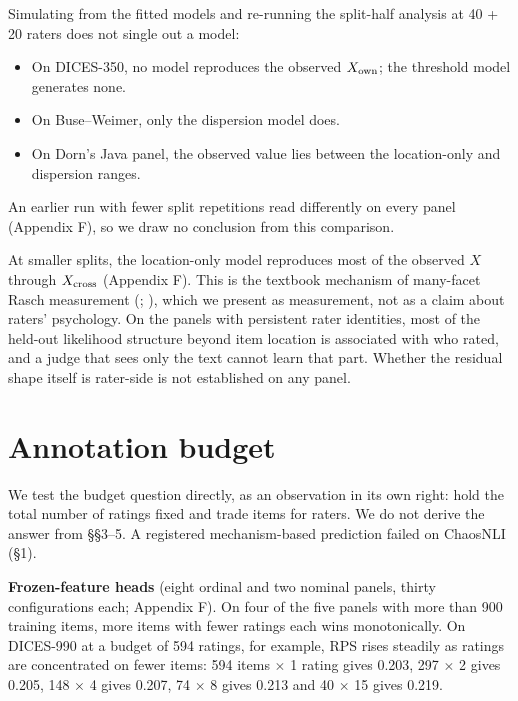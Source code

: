 \documentclass{article}
\providecommand{\tightlist}{\setlength{\itemsep}{0pt}\setlength{\parskip}{0pt}}
\begin{document}
Simulating from the fitted models and re-running the split-half analysis at 40 + 20 raters does not single out a model:

\begin{itemize}
\tightlist
\item
  On DICES-350, no model reproduces the observed \(X_{\rm own}\); the threshold model generates none.
\item
  On Buse--Weimer, only the dispersion model does.
\item
  On Dorn's Java panel, the observed value lies between the location-only and dispersion ranges.
\end{itemize}

An earlier run with fewer split repetitions read differently on every panel (Appendix F), so we draw no conclusion from this comparison.

At smaller splits, the location-only model reproduces most of the observed \(X\) through \(X_{\rm cross}\) (Appendix F). This is the textbook mechanism of many-facet Rasch measurement (\citealp{linacre1989mfrm}; \citealp{eckes2011mfrm}), which we present as measurement, not as a claim about raters' psychology. On the panels with persistent rater identities, most of the held-out likelihood structure beyond item location is associated with who rated, and a judge that sees only the text cannot learn that part. Whether the residual shape itself is rater-side is not established on any panel.

\section{Annotation budget}


We test the budget question directly, as an observation in its own right: hold the total number of ratings fixed and trade items for raters. We do not derive the answer from \S{}\S{}3--5. A registered mechanism-based prediction failed on ChaosNLI (\S{}1).

\textbf{Frozen-feature heads} (eight ordinal and two nominal panels, thirty configurations each; Appendix F). On four of the five panels with more than 900 training items, more items with fewer ratings each wins monotonically. On DICES-990 at a budget of 594 ratings, for example, RPS rises steadily as ratings are concentrated on fewer items: 594 items $\times$ 1 rating gives 0.203, 297 $\times$ 2 gives 0.205, 148 $\times$ 4 gives 0.207, 74 $\times$ 8 gives 0.213 and 40 $\times$ 15 gives 0.219.
\end{document}
